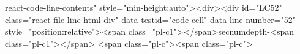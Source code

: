 react-code-line-contents" style="min-height:auto"><div><div id="LC52" class="react-file-line html-div" data-testid="code-cell" data-line-number="52" style="position:relative"><span class="pl-c1">\setcounter</span>{secnumdepth}{-<span class="pl-c1">\maxdimen</span>} <span class="pl-c"><span class="pl-c">%

